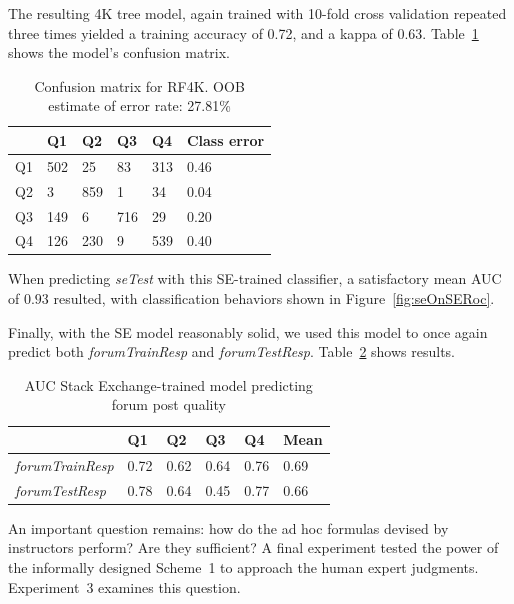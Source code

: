 The resulting 4K tree model, again trained with 10-fold cross
validation repeated three times yielded a training accuracy of 0.72,
and a kappa of 0.63. Table~\ref{tab:confSe4K} shows the model's
confusion matrix.
\begin{table}[]
\centering
\caption{Confusion matrix for RF4K. OOB estimate of  error rate: 27.81\%}
\label{tab:confSe4K}
\begin{tabular}{@{}llllll@{}}
\toprule
   & Q1  & Q2  & Q3  & Q4  & Class error \\ \midrule
Q1 & 502 & 25  & 83  & 313 & 0.46        \\
Q2 & 3   & 859 & 1   & 34  & 0.04        \\
Q3 & 149 & 6   & 716 & 29  & 0.20        \\
Q4 & 126 & 230 & 9   & 539 & 0.40        \\ \bottomrule
\end{tabular}
\end{table}
When predicting \emph{seTest} with this SE-trained classifier, a
satisfactory mean AUC of $0.93$ resulted, with classification
behaviors shown in Figure~\ref{fig:seOnSERoc}.


Finally, with the SE model reasonably solid, we used this model to
once again predict both \emph{forumTrainResp} and
\emph{forumTestResp}. Table~\ref{tab:seResult} shows results.
\begin{table}[]
  \centering
  \caption{AUC Stack Exchange-trained model predicting forum post quality}
  \label{tab:seResult}
  \begin{tabular}{@{}llllll@{}}
    \toprule
    & Q1   & Q2   & Q3   & Q4   & Mean \\ \midrule
    \emph{forumTrainResp} & 0.72 & 0.62 & 0.64 & 0.76 & 0.69 \\
    \emph{forumTestResp}  & 0.78 & 0.64 & 0.45 & 0.77 & 0.66 \\ \bottomrule
  \end{tabular}
\end{table}

An important question remains: how do the ad hoc formulas devised by
instructors perform? Are they sufficient?  A final experiment tested
the power of the informally designed Scheme~1 to approach the human
expert judgments. Experiment~3 examines this question.

